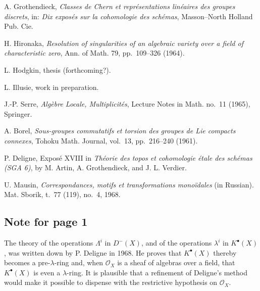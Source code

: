 \documentclass[11pt]{article}
\begin{document}
\begin{enumerate}[label={[\arabic*]},leftmargin=3.2em]
\item A. Grothendieck,
  \emph{Classes de Chern et repr\'esentations lin\'eaires des groupes
  discrets}, in: \emph{Dix expos\'es sur la cohomologie des sch\'emas},
  Masson--North Holland Pub. Cie.

\item H. Hironaka,
  \emph{Resolution of singularities of an algebraic variety over a field of
  characteristic zero}, Ann. of Math. 79, pp.~109--326 (1964).

\item L. Hodgkin, thesis (forthcoming?).

\item L. Illusie, work in preparation.

\item J.-P. Serre, \emph{Alg\`ebre Locale, Multiplicit\'es},
  Lecture Notes in Math. no.~11 (1965), Springer.

\item A. Borel,
  \emph{Sous-groupes commutatifs et torsion des groupes de Lie compacts
  connexes}, Tohoku Math. Journal, vol.~13, pp.~216--240 (1961).

\item[{[16]}(*)] P. Deligne, Expos\'e XVIII in
  \emph{Th\'eorie des topos et cohomologie \'etale des sch\'emas (SGA 6)},
  by M. Artin, A. Grothendieck, and J. L. Verdier.

\item[{[17]}(*)] U. Mausin,
  \emph{Correspondances, motifs et transformations mono\"idales}
  (in Russian). Mat. Sborik, t.~77 (119), no.~4, 1968.
\end{enumerate}


\subsection*{Note for page 1}

The theory of the operations $\Lambda^i$ in $D^{-}(X)$, and of the
operations $\lambda^i$ in $K^\bullet(X)$, was written down by P. Deligne in
1968. He proves that $K^\bullet(X)$ thereby becomes a pre-$\lambda$-ring and,
when $\mathcal O_X$ is a sheaf of algebras over a field, that
$K^\bullet(X)$ is even a $\lambda$-ring. It is plausible that a refinement
of Deligne's method would make it possible to dispense with the restrictive
hypothesis on $\mathcal O_X$.
\end{document}
